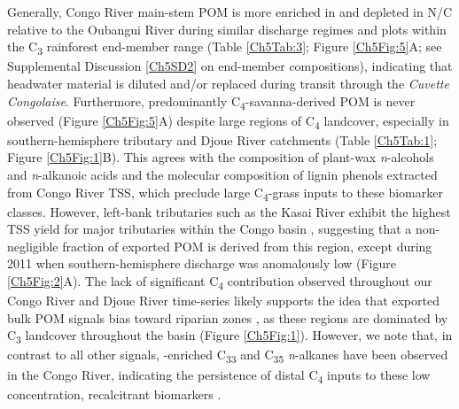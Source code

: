 Generally, Congo River main-stem POM is more enriched in  and depleted in N/C relative to the Oubangui River during similar discharge regimes \citep[Figure \ref{Ch5Fig:6}A--B;][]{Bouillon:2012cw,Bouillon:2014ko} and plots within the C\textsubscript{3} rainforest end-member range (Table \ref{Ch5Tab:3}; Figure \ref{Ch5Fig:5}A; see Supplemental Discussion \ref{Ch5SD2} on end-member compositions), indicating that headwater material is diluted and/or replaced during transit through the \textit{Cuvette Congolaise}. Furthermore, predominantly C\textsubscript{4}-savanna-derived POM is never observed (Figure \ref{Ch5Fig:5}A) despite large regions of C\textsubscript{4} landcover, especially in southern-hemisphere tributary and Djoue River catchments (Table \ref{Ch5Tab:1}; Figure \ref{Ch5Fig:1}B). This agrees with the  composition of plant-wax \textit{n}-alcohols and \textit{n}-alkanoic acids \citep{Hemingway:2016bq} and the molecular composition of lignin phenols \citep{Spencer:2016ho} extracted from Congo River TSS, which preclude large C\textsubscript{4}-grass inputs to these biomarker classes. However, left-bank tributaries such as the Kasai River exhibit the highest TSS yield for major tributaries within the Congo basin \citep{Laraque:2009fz}, suggesting that a non-negligible fraction of exported POM is derived from this region, except during 2011 when southern-hemisphere discharge was anomalously low (Figure \ref{Ch5Fig:2}A). The lack of significant C\textsubscript{4} contribution observed throughout our Congo River and Djoue River time-series likely supports the idea that exported bulk POM signals bias toward riparian zones \citep{Bouillon:2012cw}, as these regions are dominated by C\textsubscript{3} landcover throughout the basin (Figure \ref{Ch5Fig:1}). However, we note that, in contrast to all other signals, -enriched C\textsubscript{33} and C\textsubscript{35} \textit{n}-alkanes have been observed in the Congo River, indicating the persistence of distal C\textsubscript{4} inputs to these low concentration, recalcitrant biomarkers \citep{Hemingway:2016bq}.

